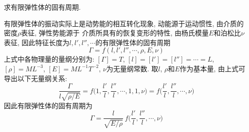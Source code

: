 \begin{problem}[22]
求有限弹性体的固有周期.
\end{problem}
\begin{solution}
有限弹性体的振动实际上是动势能的相互转化现象, 动能源于运动惯性, 由介质的密度$\rho$表征, 弹性势能源于
介质所具有的恢复变形的特性, 由杨氏模量$E$和泊松比$\nu$表征, 因此特征长度为$l,l',l'',\cdots$的有限弹性体的固有周期
\[
\Gamma = f(l,l',l'',\cdots,\rho,E,\nu)
\]
上式中各物理量的量纲分别为: $[\Gamma]=T$, $[l]=[l']=[l'']=\cdots = L$, $[\rho]=ML^{-3}$, $[E]=ML^{-1}T^{-2}$, $\nu$为无量纲常数. 取$l$, $\rho$和$E$作为基本量, 由上式可导出以下无量纲关系:
\[
\frac{\Gamma}{l\sqrt{\rho/E}} = f\bigg(1,\frac{l'}{l},\frac{l''}{l}, \cdots, 1, 1, \nu\bigg) = f\bigg(\frac{l'}{l},\frac{l''}{l}, \cdots, \nu\bigg)
\]
因此有限弹性体的固有周期为
\[
\Gamma = \frac{l}{\sqrt{E/\rho}}~f\bigg(\frac{l'}{l},\frac{l''}{l}, \cdots, \nu\bigg)
\]
\end{solution}
